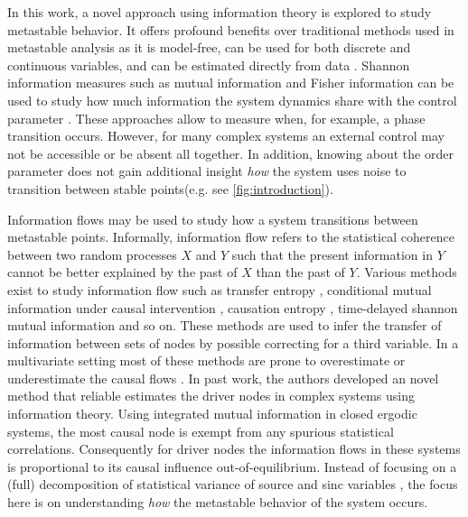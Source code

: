 \documentclass[a4paper, 11pt, twocolumn]{article}
\begin{document}
In this  work, a novel  approach using information  theory is
explored to  study metastable  behavior. It  offers profound
benefits  over   traditional  methods  used   in  metastable
analysis as it is model-free,  can be used for both discrete
and continuous variables, and can be estimated directly from
data  \cite{Cover2005}. Shannon  information measures  such as
mutual  information and  Fisher information  can be  used to
study how  much information  the system dynamics  share with
the  control  parameter  \cite{Nicolis2016,Lizier2010}.  These
approaches  allow  to measure  when,  for  example, a  phase
transition  occurs. However,  for  many  complex systems  an
external  control may  not be  accessible or  be absent  all
together.  In addition,  knowing about  the order  parameter
does not gain additional insight \emph{how} the system uses noise
to    transition    between     stable    points(e.g.    see
\cref{fig:introduction}).

Information  flows  may  be  used  to  study  how  a  system
transitions    between   metastable    points.   Informally,
information flow refers to the statistical coherence between
two  random processes  $X$  and $Y$  such  that the  present
information in $Y$ cannot be better explained by the past of
$X$ than  the past  of $Y$. Various  methods exist  to study
information  flow such  as transfer  entropy \cite{Schreiber},
conditional  mutual  information under  causal  intervention
\cite{Ay2008}, causation  entropy \cite{Runge2019}, time-delayed
shannon  mutual information  \cite{Li2018}  and  so on.  These
methods  are  used  to  infer the  transfer  of  information
between sets  of nodes  by possible  correcting for  a third
variable. In  a multivariate  setting most of  these methods
are prone to overestimate  or underestimate the causal flows
\cite{James2016}. In past work, the authors developed an novel
method that  reliable estimates the driver  nodes in complex
systems  using information  theory. Using  integrated mutual
information in closed ergodic  systems, the most causal node
is  exempt  from   any  spurious  statistical  correlations.
Consequently for driver nodes the information flows in these
systems   is   proportional    to   its   causal   influence
out-of-equilibrium.   Instead  of   focusing  on   a  (full)
decomposition  of statistical  variance of  source and  sinc
variables  \cite{Janzing2013,Schamberg2020,Williams2010a}, the
focus here is on understanding \emph{how} the metastable behavior
of the system occurs.
\end{document}
